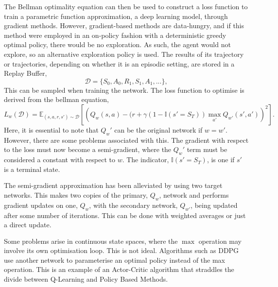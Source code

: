 The Bellman optimality equation can then be used to construct a loss function to train a parametric function approximation, a deep learning model, through gradient methods. However, gradient-based methods are data-hungry, and if this method were employed in an on-policy fashion with a deterministic greedy optimal policy, there would be no exploration. As such, the agent would not explore, so an alternative exploration policy is used. The results of its trajectory or trajectories, depending on whether it is an episodic setting, are stored in a Replay Buffer,
\begin{equation}
	\mathcal{D} = \{S_0, A_0, R_1, S_1, A_1,...\},
\end{equation}
This can be sampled when training the network. The loss function to optimise is derived from the bellman equation,
\begin{equation}
	L_{w}(\mathcal{D}) = \mathbb{E}_{(s,a,r,s') \sim \mathcal{D}}\left[\left(Q_w(s,a) -(r + \gamma(1-\mathbb{I}(s'= S_{T}))\max_{a'}Q_{w'}(s', a')\right)^2\right].
\end{equation}
Here, it is essential to note that $Q_w'$ can be the original network if $w = w'$. However, there are some problems associated with this. The gradient with respect to the loss must now become a semi-gradient, where the $Q_w'$ term must be considered a constant with respect to $w$. The indicator, $\mathbb{I}(s' = S_T)$,  is one if $s'$ is a terminal state.

The semi-gradient approximation has been alleviated by using two target networks\cite{minh2016asynchronous}. This makes two copies of the primary, $Q_w$, network and performs gradient updates on one, $Q_w$, with the secondary network, $Q_{w'}$, being updated after some number of iterations. This can be done with weighted averages or just a direct update.

Some problems arise in continuous state spaces, where the $\max$ operation may involve its own optimisation loop. This is not ideal. Algorithms such as DDPG\cite{DDPg} use another network to parameterise an optimal policy instead of the max operation. This is an example of an Actor-Critic algorithm that straddles the divide between Q-Learning and Policy Based Methods.
